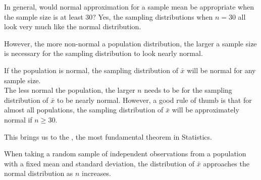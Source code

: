 \begin{example}{In general, would normal approximation for a sample mean be appropriate when the sample size is at least 30?}
Yes, the sampling distributions when $n = 30$ all look very much like the normal distribution.

However, the more non-normal a population distribution, the larger a sample size is necessary for the sampling distribution to look nearly normal.
\end{example}

\begin{termBox}{
If the population is normal, the sampling distribution of $\bar{x}$ will be normal for any sample size. \\[2mm]
The less normal the population, the larger $n$ needs to be for the sampling distribution of $\bar{x}$ to be nearly normal. However, a good rule of thumb is that for almost all populations, the sampling distribution of $\bar{x}$ will be approximately normal if $n \ge 30$.}
\end{termBox}

This brings us to the , the most fundamental theorem in Statistics.

\begin{termBox}{
When taking a random sample of independent observations from a population with a fixed mean and standard deviation, the distribution of $\bar{x}$ approaches the normal distribution as $n$ increases.}
\end{termBox}

